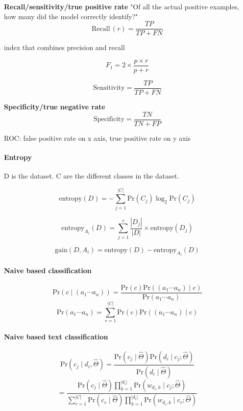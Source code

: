 \documentclass[12pt,oneside,a4paper]{article}
\begin{document}
\textbf{Recall/sensitivity/true positive rate} "Of all the actual positive examples, how many did the model correctly identify?"
\[
    \text{Recall} \, (r) = \frac{TP}{TP + FN}
\]

index that combines precision and recall

\[
    F_1 = 2 \times \frac{p \times r}{p + r}
\]

\[
    \text{Sensitivity} = \frac{TP}{TP + FN}
\]

\textbf{Specificity/true negative rate}
\[
    \text{Specificity} = \frac{TN}{TN + FP}
\]

ROC: false positive rate on x axis, true positive rate on y axis



\paragraph{Entropy}
D is the dataset. C are the different classes in the dataset.

\[
    \text{entropy}(D) = - \sum_{j=1}^{|C|} \text{Pr}(C_j) \log_2 \text{Pr}(C_j)
\]

\[
    \text{entropy}_{A_i}(D) = \sum_{j=1}^{v} \frac{|D_j|}{|D|} \times \text{entropy}(D_j)
\]

\[
    \text{gain}(D, A_i) = \text{entropy}(D) - \text{entropy}_{A_i}(D)
\]

\paragraph{Naive based classification}
\[
    \text{Pr}(c \mid (a_1 \cdots a_n)) = \frac{\text{Pr}(c)  \text{Pr}((a_1 \cdots a_n) \mid c)}{\text{Pr}(a_1 \cdots a_n)}
\]
\[
    \text{Pr}(a_1 \cdots a_n) = \sum_{r=1}^{|C|} \text{Pr}(c) \text{Pr}((a_1  \cdots a_n) \mid c)
\]

\paragraph{Naive based text classification}
\[
    \text{Pr}(c_j \mid d_i, \hat{\Theta}) = \frac{\text{Pr}(c_j \mid \hat{\Theta}) \text{Pr}(d_i \mid c_j; \hat{\Theta})}{\text{Pr}(d_i \mid \hat{\Theta})}
\]
\[
    = \frac{\text{Pr}(c_j \mid \hat{\Theta}) \prod_{k=1}^{|d_i|} \text{Pr}(w_{d_i,k} \mid c_j; \hat{\Theta})}{\sum_{r=1}^{|C|} \text{Pr}(c_r \mid \hat{\Theta}) \prod_{k=1}^{|d_i|} \text{Pr}(w_{d_i,k} \mid c_r; \hat{\Theta})}
\]
\end{document}
